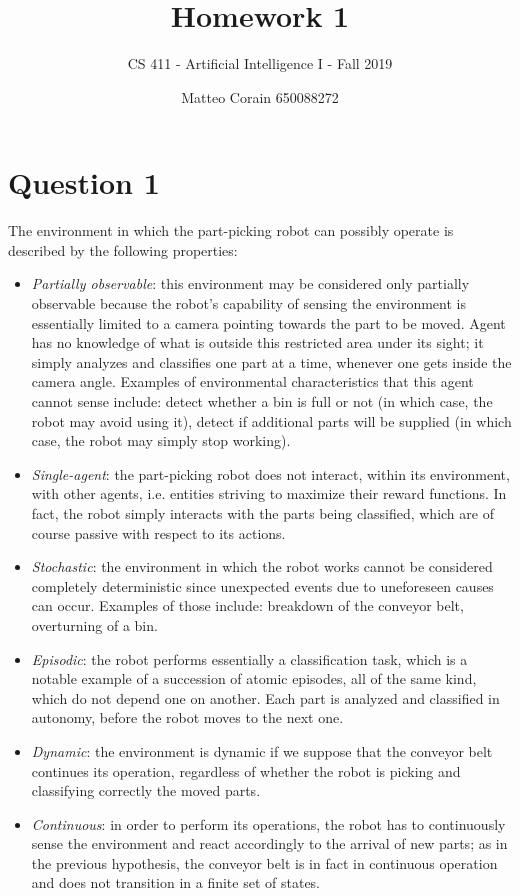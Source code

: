 \documentclass[letterpaper,headings=standardclasses]{scrartcl}
\title{Homework 1}
\subtitle{CS 411 - Artificial Intelligence I - Fall 2019}
\author{Matteo Corain 650088272}
\begin{document}
\maketitle

\section{Question 1}

The environment in which the part-picking robot can possibly operate is described by the following properties:

\begin{itemize}

\item \emph{Partially observable}: this environment may be considered only partially observable because the robot's capability of sensing the environment is essentially limited to a camera pointing towards the part to be moved. Agent has no knowledge of what is outside this restricted area under its sight; it simply analyzes and classifies one part at a time, whenever one gets inside the camera angle. Examples of environmental characteristics that this agent cannot sense include: detect whether a bin is full or not (in which case, the robot may avoid using it), detect if additional parts will be supplied (in which case, the robot may simply stop working).

\item \emph{Single-agent}: the part-picking robot does not interact, within its environment, with other agents, i.e. entities striving to maximize their reward functions. In fact, the robot simply interacts with the parts being classified, which are of course passive with respect to its actions.

\item \emph{Stochastic}: the environment in which the robot works cannot be considered completely deterministic since unexpected events due to uneforeseen causes can occur. Examples of those include: breakdown of the conveyor belt, overturning of a bin.

\item \emph{Episodic}: the robot performs essentially a classification task, which is a notable example of a succession of atomic episodes, all of the same kind, which do not depend one on another. Each part is analyzed and classified in autonomy, before the robot moves to the next one.

\item \emph{Dynamic}: the environment is dynamic if we suppose that the conveyor belt continues its operation, regardless of whether the robot is picking and classifying correctly the moved parts.

\item \emph{Continuous}: in order to perform its operations, the robot has to continuously sense the environment and react accordingly to the arrival of new parts; as in the previous hypothesis, the conveyor belt is in fact in continuous operation and does not transition in a finite set of states.

\end{itemize}
\end{document}
